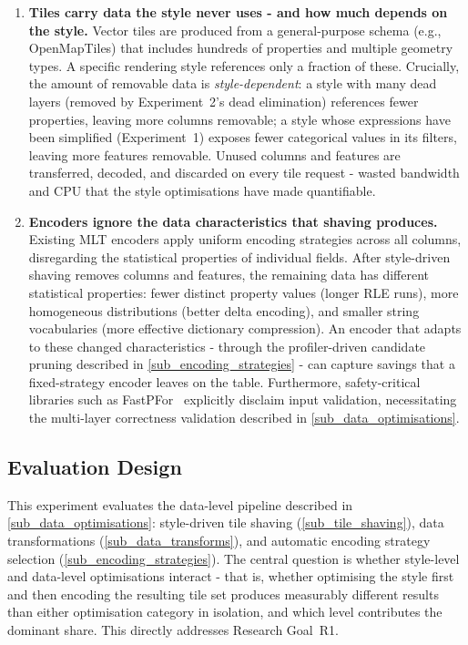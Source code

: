 \begin{enumerate}
    \item \textbf{Tiles carry data the style never uses - and how much depends on the style.}
    Vector tiles are produced from a general-purpose schema (e.g., OpenMapTiles) that includes hundreds of properties and multiple geometry types.
    A specific rendering style references only a fraction of these.
    Crucially, the amount of removable data is \emph{style-dependent}: a style with many dead layers (removed by Experiment~2's dead elimination) references fewer properties, leaving more columns removable; a style whose expressions have been simplified (Experiment~1) exposes fewer categorical values in its filters, leaving more features removable.
    Unused columns and features are transferred, decoded, and discarded on every tile request - wasted bandwidth and CPU that the style optimisations have made quantifiable.

    \item \textbf{Encoders ignore the data characteristics that shaving produces.}
    Existing \ac{MLT} encoders apply uniform encoding strategies across all columns, disregarding the statistical properties of individual fields.
    After style-driven shaving removes columns and features, the remaining data has different statistical properties: fewer distinct property values (longer \ac{RLE} runs), more homogeneous distributions (better delta encoding), and smaller string vocabularies (more effective dictionary compression).
    An encoder that adapts to these changed characteristics - through the profiler-driven candidate pruning described in \cref{sub_encoding_strategies} - can capture savings that a fixed-strategy encoder leaves on the table.
    Furthermore, safety-critical libraries such as FastPFor~\cite{lemireDecodingBillionsIntegers2015} explicitly disclaim input validation, necessitating the multi-layer correctness validation described in \cref{sub_data_optimisations}.
\end{enumerate}

\subsection{Evaluation Design}\label{sub_mlt_evaluation}

This experiment evaluates the data-level pipeline described in \cref{sub_data_optimisations}: style-driven tile shaving (\cref{sub_tile_shaving}), data transformations (\cref{sub_data_transforms}), and automatic encoding strategy selection (\cref{sub_encoding_strategies}).
The central question is whether style-level and data-level optimisations interact - that is, whether optimising the style first and then encoding the resulting tile set produces measurably different results than either optimisation category in isolation, and which level contributes the dominant share.
This directly addresses Research Goal~R1.

